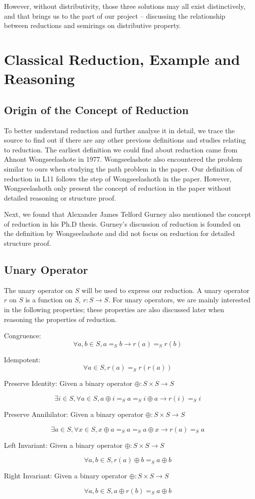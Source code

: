 \documentclass[a4paper,12pt,twoside,openright]{report}
\newcommand{\e}[2]{
\begin{equation}
  \label{#1} 
  #2
\end{equation}
}
\begin{document}
However, without distributivity, those three solutions may all exist distinctively,  and that brings us to the part of our project – discussing the relationship between reductions and semirings on distributive property.

\section{Classical Reduction, Example and Reasoning}
\subsection{Origin of the Concept of Reduction}
To better understand reduction and further analyse it in detail, we trace the source to find out if there are any other previous definitions and studies relating to reduction. 
The earliest definition we could find about reduction came from Ahnont Wongseelashote in 1977\cite{WONGSEELASHOTE197955}. Wongseelashote also encountered the problem similar to ours when studying the path problem in the paper. Our definition of reduction in L11 follows the step of Wongseelashoth in the paper. However, Wongseelashoth only present the concept of reduction in the paper without detailed reasoning or structure proof.

Next, we found that Alexander James Telford Gurney also mentioned the concept of reduction in his Ph.D thesis\cite{gurney_construction_2010}. Gurney's discussion of reduction is founded on the definition by Wongseelashote and did not focus on reduction for detailed structure proof.

\subsection{Unary Operator}
The unary operator on $S$ will be used to express our reduction. A unary operator $r$ on $S$ is a function on $S$, $r : S \rightarrow S$. 
For unary operators, we are mainly interested in the following properties; these properties are also discussed later when reasoning the properties of reduction.

Congruence: \e{def:uop:congruence}{\forall a,b \in S, a =_S b \rightarrow r(a) =_S r(b)}
Idempotent: \e{def:uop:idempotent}{\forall a \in S, r(a) =_S r(r(a))}
Preserve Identity: Given a binary operator $\oplus : S \times S \rightarrow S$
\e{def:uop:preserve_id}{\exists i \in S, \forall a \in S, a \oplus i =_S a =_S i \oplus a \rightarrow r(i) =_S i}
Preserve Annihilator: Given a binary operator $\oplus : S \times S \rightarrow S$
\e{def:uop:preserve_ann}{\exists a \in S, \forall x \in S, x \oplus a =_S a =_S a \oplus x \rightarrow r(a) =_S a}
Left Invariant: Given a binary operator $\oplus : S \times S \rightarrow S$
\e{def:uop:left_invariant}{\forall a,b \in S, r(a) \oplus b =_S a \oplus b}
Right Invariant: Given a binary operator $\oplus : S \times S \rightarrow S$
\e{def:uop:right_invariant}{\forall a,b \in S, a \oplus r(b) =_S a \oplus b}
\end{document}
